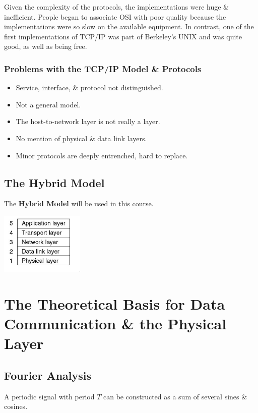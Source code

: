 \documentclass[11pt]{article}
\begin{document}
Given the complexity of the protocols, the implementations were huge \& inefficient. 
People began to associate OSI with poor quality because the implementations were so slow on the available equipment. 
In contrast, one of the first implementations of TCP/IP was part of Berkeley's UNIX and was quite good, as well as being free. 

\subsubsection{Problems with the TCP/IP Model \& Protocols} 
\begin{itemize}
    \item Service, interface, \& protocol not distinguished. 
    \item Not a general model. 
    \item The host-to-network layer is not really a layer. 
    \item No mention of physical \& data link layers. 
    \item Minor protocols are deeply entrenched, hard to replace. 
\end{itemize}

\newpage
\subsection{The Hybrid Model}
The \textbf{Hybrid Model} will be used in this course. 

\begin{center}
    \includegraphics[width=0.3\textwidth]{hybridmodel.png}
\end{center}

\section{The Theoretical Basis for Data Communication \& the Physical Layer}
\subsection{Fourier Analysis}
A periodic signal with period $T$ can be constructed as a sum of several sines \& cosines. 
\end{document}
